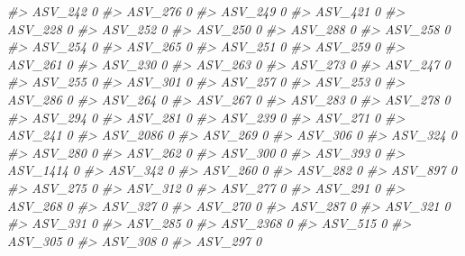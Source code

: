 \documentclass[
]{article}
\newenvironment{Shaded}{\begin{snugshade}}{\end{snugshade}}
\newcommand{\CommentTok}[1]{\textcolor[rgb]{0.56,0.35,0.01}{\textit{#1}}}
\begin{document}
\begin{Shaded}
\begin{Highlighting}[]
\CommentTok{\#\textgreater{} ASV\_242   0}
\CommentTok{\#\textgreater{} ASV\_276   0}
\CommentTok{\#\textgreater{} ASV\_249   0}
\CommentTok{\#\textgreater{} ASV\_421   0}
\CommentTok{\#\textgreater{} ASV\_228   0}
\CommentTok{\#\textgreater{} ASV\_252   0}
\CommentTok{\#\textgreater{} ASV\_250   0}
\CommentTok{\#\textgreater{} ASV\_288   0}
\CommentTok{\#\textgreater{} ASV\_258   0}
\CommentTok{\#\textgreater{} ASV\_254   0}
\CommentTok{\#\textgreater{} ASV\_265   0}
\CommentTok{\#\textgreater{} ASV\_251   0}
\CommentTok{\#\textgreater{} ASV\_259   0}
\CommentTok{\#\textgreater{} ASV\_261   0}
\CommentTok{\#\textgreater{} ASV\_230   0}
\CommentTok{\#\textgreater{} ASV\_263   0}
\CommentTok{\#\textgreater{} ASV\_273   0}
\CommentTok{\#\textgreater{} ASV\_247   0}
\CommentTok{\#\textgreater{} ASV\_255   0}
\CommentTok{\#\textgreater{} ASV\_301   0}
\CommentTok{\#\textgreater{} ASV\_257   0}
\CommentTok{\#\textgreater{} ASV\_253   0}
\CommentTok{\#\textgreater{} ASV\_286   0}
\CommentTok{\#\textgreater{} ASV\_264   0}
\CommentTok{\#\textgreater{} ASV\_267   0}
\CommentTok{\#\textgreater{} ASV\_283   0}
\CommentTok{\#\textgreater{} ASV\_278   0}
\CommentTok{\#\textgreater{} ASV\_294   0}
\CommentTok{\#\textgreater{} ASV\_281   0}
\CommentTok{\#\textgreater{} ASV\_239   0}
\CommentTok{\#\textgreater{} ASV\_271   0}
\CommentTok{\#\textgreater{} ASV\_241   0}
\CommentTok{\#\textgreater{} ASV\_2086  0}
\CommentTok{\#\textgreater{} ASV\_269   0}
\CommentTok{\#\textgreater{} ASV\_306   0}
\CommentTok{\#\textgreater{} ASV\_324   0}
\CommentTok{\#\textgreater{} ASV\_280   0}
\CommentTok{\#\textgreater{} ASV\_262   0}
\CommentTok{\#\textgreater{} ASV\_300   0}
\CommentTok{\#\textgreater{} ASV\_393   0}
\CommentTok{\#\textgreater{} ASV\_1414  0}
\CommentTok{\#\textgreater{} ASV\_342   0}
\CommentTok{\#\textgreater{} ASV\_260   0}
\CommentTok{\#\textgreater{} ASV\_282   0}
\CommentTok{\#\textgreater{} ASV\_897   0}
\CommentTok{\#\textgreater{} ASV\_275   0}
\CommentTok{\#\textgreater{} ASV\_312   0}
\CommentTok{\#\textgreater{} ASV\_277   0}
\CommentTok{\#\textgreater{} ASV\_291   0}
\CommentTok{\#\textgreater{} ASV\_268   0}
\CommentTok{\#\textgreater{} ASV\_327   0}
\CommentTok{\#\textgreater{} ASV\_270   0}
\CommentTok{\#\textgreater{} ASV\_287   0}
\CommentTok{\#\textgreater{} ASV\_321   0}
\CommentTok{\#\textgreater{} ASV\_331   0}
\CommentTok{\#\textgreater{} ASV\_285   0}
\CommentTok{\#\textgreater{} ASV\_2368  0}
\CommentTok{\#\textgreater{} ASV\_515   0}
\CommentTok{\#\textgreater{} ASV\_305   0}
\CommentTok{\#\textgreater{} ASV\_308   0}
\CommentTok{\#\textgreater{} ASV\_297   0}

\end{Highlighting}
\end{Shaded}
\end{document}
